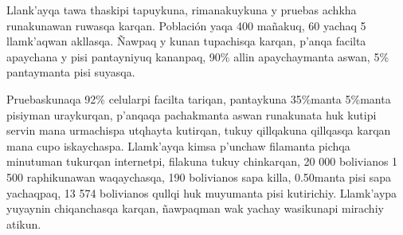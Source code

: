 Llank'ayqa tawa thaskipi tapuykuna, rimanakuykuna y pruebas achkha runakunawan ruwasqa karqan. Población yaqa 400 mañakuq, 60 yachaq 5 llamk'aqwan akllasqa. Ñawpaq y kunan tupachisqa karqan, p'anqa facilta apaychana y pisi pantayniyuq kananpaq, 90\% allin apaychaymanta aswan, 5\% pantaymanta pisi suyasqa.

Pruebaskunaqa 92\% celularpi facilta tariqan, pantaykuna 35\%manta 5\%manta pisiyman uraykurqan, p'anqaqa pachakmanta aswan runakunata huk kutipi servin mana urmachispa utqhayta kutirqan, tukuy qillqakuna qillqasqa karqan mana cupo iskaychaspa. Llamk'ayqa kimsa p'unchaw filamanta pichqa minutuman tukurqan internetpi, filakuna tukuy chinkarqan, 20 000 bolivianos 1 500 raphikunawan waqaychasqa, 190 bolivianos sapa killa, 0.50manta pisi sapa yachaqpaq, 13 574 bolivianos qullqi huk muyumanta pisi kutirichiy. Llamk'aypa yuyaynin chiqanchasqa karqan, ñawpaqman wak yachay wasikunapi mirachiy atikun.

